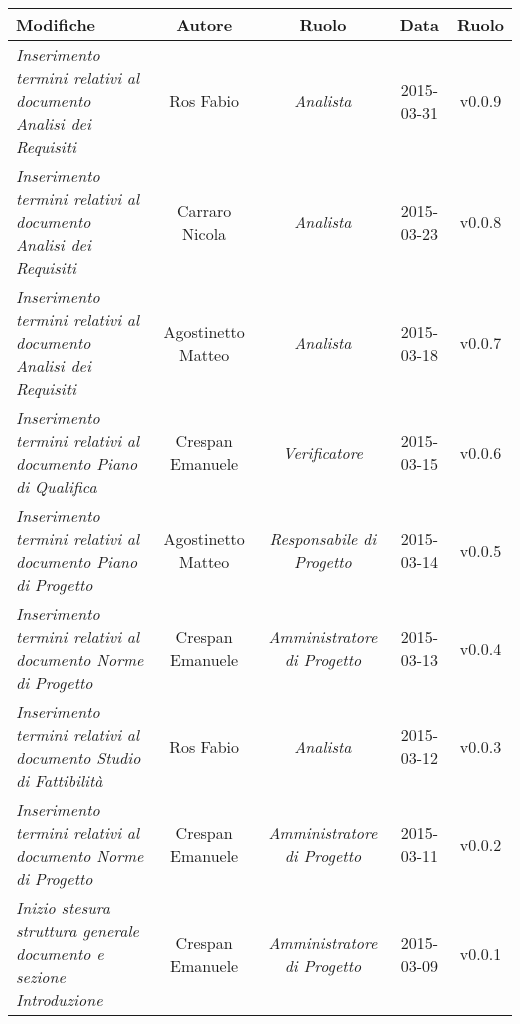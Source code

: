 \newpage

\begin{table}[h]
\centering
\begin{tabular}{|p{}|c|c|c|c|}
	\toprule
		\textbf{Modifiche} & \textbf{Autore} & \textbf{Ruolo} & \textbf{Data} & \textbf{Ruolo} \\
	\midrule
	\midrule
		\textit{Inserimento termini relativi al documento Analisi dei Requisiti} & Ros Fabio & \textit{Analista} & 2015-03-31 & v0.0.9 \\
	\midrule
		\textit{Inserimento termini relativi al documento Analisi dei Requisiti} & Carraro Nicola & \textit{Analista} & 2015-03-23 & v0.0.8 \\
	\midrule
		\textit{Inserimento termini relativi al documento Analisi dei Requisiti} & Agostinetto Matteo & \textit{Analista} & 2015-03-18 & v0.0.7 \\
	\midrule
		\textit{Inserimento termini relativi al documento Piano di Qualifica} & Crespan Emanuele & \textit{Verificatore} & 2015-03-15 & v0.0.6 \\
	\midrule
		\textit{Inserimento termini relativi al documento Piano di Progetto} & Agostinetto Matteo & \textit{Responsabile di Progetto} & 2015-03-14 & v0.0.5 \\
	\midrule
		\textit{Inserimento termini relativi al documento Norme di Progetto} & Crespan Emanuele & \textit{Amministratore di Progetto} & 2015-03-13 & v0.0.4 \\
	\midrule
		\textit{Inserimento termini relativi al documento Studio di Fattibilità} & Ros Fabio & \textit{Analista} & 2015-03-12 & v0.0.3 \\
	\midrule
		\textit{Inserimento termini relativi al documento Norme di Progetto} & Crespan Emanuele & \textit{Amministratore di Progetto} & 2015-03-11 & v0.0.2 \\	                         
	\midrule
		\textit{Inizio stesura struttura generale documento e sezione Introduzione} & Crespan Emanuele & \textit{Amministratore di Progetto} & 2015-03-09 & v0.0.1 \\
	\bottomrule
\end{tabular}	
\end{table}

\newpage